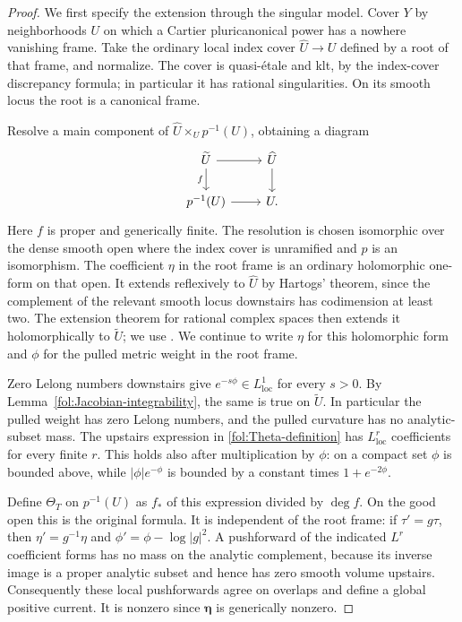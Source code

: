\documentclass[11pt,letterpaper]{article}
\theoremstyle{definition}
\theoremstyle{remark}
\begin{document}
\begin{proof}
We first specify the extension through the singular model.  Cover $Y$
by neighborhoods $U$ on which a Cartier pluricanonical power has a
nowhere vanishing frame.  Take the ordinary local index cover
$\widehat U\to U$ defined by a root of that frame, and normalize.
The cover is quasi-\'etale and klt, by the index-cover discrepancy
formula; in particular it has rational singularities.  On its smooth
locus the root is a canonical frame.

Resolve a main component of
$\widehat U\times_U p^{-1}(U)$, obtaining a diagram
\[
 \begin{tikzcd}
 \widetilde U \arrow[r] \arrow[d,"f"'] & \widehat U \arrow[d]\\
 p^{-1}(U) \arrow[r] & U .
 \end{tikzcd}
\]
Here $f$ is proper and generically finite.  The resolution is chosen
isomorphic over the dense smooth open where the index cover is
unramified and $p$ is an isomorphism.  The coefficient $\eta$ in the
root frame is an ordinary holomorphic one-form on that open.
It extends reflexively to $\widehat U$ by Hartogs' theorem, since the
complement of the relevant smooth locus downstairs has codimension at
least two.  The extension theorem for rational complex spaces then
extends it holomorphically to $\widetilde U$; we use
\cite[Corollary~1.8]{KebekusSchnellExtension}.
We continue to write $\eta$ for this holomorphic form and $\phi$ for the
pulled metric weight in the root frame.

Zero Lelong numbers downstairs give
$e^{-s\phi}\in L^1_{\mathrm{loc}}$ for every $s>0$.  By
Lemma~\ref{fol:Jacobian-integrability}, the same is true on
$\widetilde U$.  In particular the pulled weight has zero Lelong
numbers, and the pulled curvature has no analytic-subset mass.
The upstairs expression in \eqref{fol:Theta-definition} has
$L^r_{\mathrm{loc}}$ coefficients for every finite $r$.  This holds
also after multiplication by $\phi$: on a compact set $\phi$ is
bounded above, while $|\phi|e^{-\phi}$ is bounded by a constant times
$1+e^{-2\phi}$.

Define $\Theta_T$ on $p^{-1}(U)$ as $f_*$ of this expression divided
by $\deg f$.  On the good open this is the original formula.  It is
independent of the root frame: if $\tau'=g\tau$, then
$\eta'=g^{-1}\eta$ and $\phi'=\phi-\log|g|^2$.
A pushforward of the indicated $L^r$ coefficient forms has no mass on
the analytic complement, because its inverse image is a proper
analytic subset and hence has zero smooth volume upstairs.
Consequently these local pushforwards agree on overlaps and define
a global positive current.  It is nonzero since
$\boldsymbol\eta$ is generically nonzero.


\end{proof}
\end{document}
